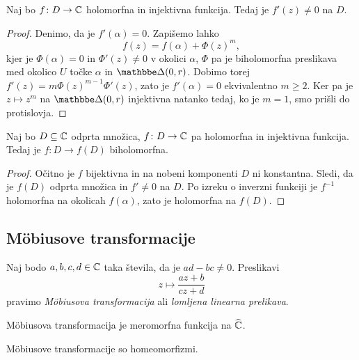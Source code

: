 \begin{posledica}
Naj bo $f \colon D \to \mathbb{C}$ holomorfna in injektivna funkcija. Tedaj
je $f'(z) \ne 0$ na $D$.
\end{posledica}

\begin{proof}
Denimo, da je $f'(\alpha) = 0$. Zapišemo lahko
\[
f(z) = f(\alpha) + \Phi(z)^m,
\]
kjer je $\Phi(\alpha) = 0$ in $\Phi'(z) \ne 0$ v okolici $\alpha$,
$\Phi$ pa je biholomorfna preslikava med okolico $U$ točke $\alpha$
in $\dsk(0, r)$. Dobimo torej $f'(z) = m \Phi(z)^{m-1} \Phi'(z)$,
zato je $f'(\alpha) = 0$ ekvivalentno $m \geq 2$. Ker pa je
$z \mapsto z^m$ na $\dsk(0, r)$ injektivna natanko tedaj, ko je
$m = 1$, smo prišli do protislovja.
\end{proof}

\begin{posledica}
Naj bo $D \subseteq \mathbb{C}$ odprta množica, $f \colon D \to \mathbb{C}$ pa
holomorfna in injektivna funkcija. Tedaj je $f \colon D \to f(D)$
biholomorfna.
\end{posledica}

\begin{proof}
Očitno je $f$ bijektivna in na nobeni komponenti $D$ ni konstantna.
Sledi, da je $f(D)$ odprta množica in $f' \ne 0$ na $D$. Po izreku
o inverzni funkciji je $f^{-1}$ holomorfna na okolicah $f(\alpha)$,
zato je holomorfna na $f(D)$.
\end{proof}

\newpage

\subsection{Möbiusove transformacije}

\begin{definicija}
Naj bodo $a, b, c, d \in \mathbb{C}$ taka števila, da je $ad - bc \ne 0$.
Preslikavi
\[
z \mapsto \frac{az + b}{cz + d}
\]
pravimo
\emph{Möbiusova transformacija}
ali \emph{lomljena linearna prelikava}.
\end{definicija}

\begin{opomba}
Möbiusova transformacija je meromorfna funkcija na $\widehat{\mathbb{C}}$.
\end{opomba}

\begin{opomba}
Möbiusove transformacije so homeomorfizmi.
\end{opomba}

